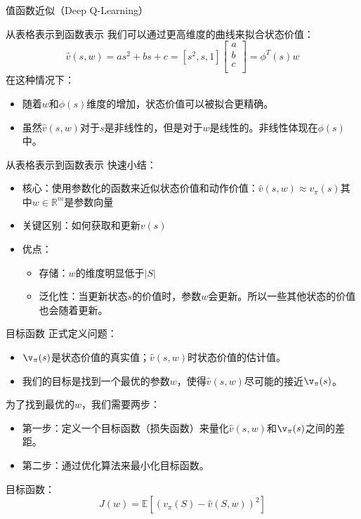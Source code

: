\begin{section}{值函数近似\alert{（Deep Q-Learning）}}
\begin{frame}{从表格表示到函数表示}
   我们可以通过更高维度的曲线来拟合状态价值：
   \[
        \hat{v}(s,w)=as^2+bs+c=[s^2,s,1]\begin{bmatrix}
            a \\
            b \\
            c \\
        \end{bmatrix}=\phi^T(s)w
   \]
   在这种情况下：
   \begin{itemize}
    \item 随着$w$和$\phi(s)$维度的增加，状态价值可以被拟合更精确。
    \item 虽然$\hat{v}(s,w)$对于$s$是非线性的，但是对于$w$是线性的。非线性体现在$\phi(s)$中。
   \end{itemize}
\end{frame}

\begin{frame}{从表格表示到函数表示}
    快速小结：
    \begin{itemize}
     \item 核心：使用\alert{参数化的函数}来近似状态价值和动作价值：$\hat{v}(s,w)\approx v_\pi(s)$其中$w\in \mathbb{R}^m$是参数向量
     \item 关键区别：如何获取和更新$v(s)$
     \item 优点：
    \begin{itemize}
        \item 存储：$w$的维度明显低于$|S|$
        \item 泛化性：当更新状态$s$的价值时，参数$w$会更新。所以一些其他状态的价值也会随着更新。
    \end{itemize}
    \end{itemize}
\end{frame}

\begin{frame}{目标函数}
    正式定义问题：
    \begin{itemize}
        \item $\v_\pi(s)$是状态价值的\alert{真实值}；$\hat{v}(s,w)$时状态价值的\alert{估计值}。
        \item 我们的目标是找到一个最优的参数$w$，使得$\hat{v}(s,w)$尽可能的接近$\v_\pi(s)$。
    \end{itemize}
    为了找到最优的$w$，我们需要两步：
    \begin{itemize}
        \item 第一步：定义一个目标函数（损失函数）来量化$\hat{v}(s,w)$和$\v_\pi(s)$之间的差距。
        \item 第二步：通过优化算法来最小化目标函数。
    \end{itemize}
    \alert{目标函数：
        \[
            J(w)=\mathbb{E}[(v_\pi(S)-\hat{v}(S,w))^2]
        \]
    }
\end{frame}


\end{section}
